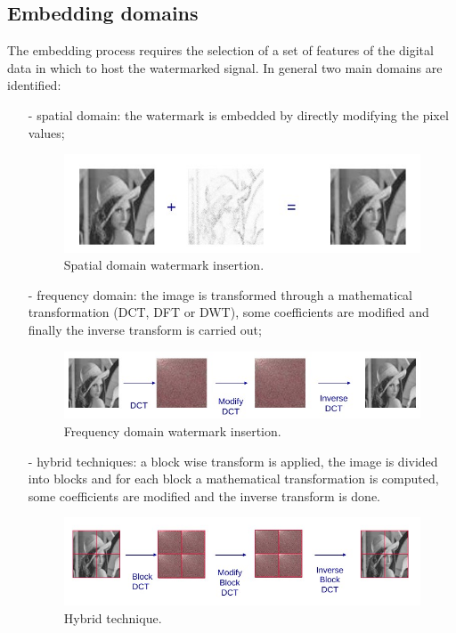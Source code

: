 \subsection{Embedding domains}
The embedding process requires the selection of a set of features of the digital data in which to host the watermarked signal. In general two main domains are identified:
\begin{itemize}
\item[-] spatial domain: the watermark is embedded by directly modifying the pixel values;
\begin{figure}[h!]
\centering
\includegraphics[width=1\textwidth]{./img/domain1.jpg}
\caption{\small{Spatial domain watermark insertion.}}
\label{fig:dom1}
\end{figure}
\item[-] frequency domain: the image is transformed through a mathematical transformation (DCT, DFT or DWT), some coefficients are modified and finally the inverse transform is carried out;
\begin{figure}[h!]
\centering
\includegraphics[width=1\textwidth]{./img/domain2.jpg}
\caption{\small{Frequency domain watermark insertion.}}
\label{fig:dom2}
\end{figure}
\item[-] hybrid techniques: a block wise transform is applied, the image is divided
into blocks and for each block a mathematical transformation is computed, some coefficients are modified and the inverse transform is done.
\begin{figure}[h!]
\centering
\includegraphics[width=1\textwidth]{./img/domain3.jpg}
\caption{\small{Hybrid technique.}}
\label{fig:dom3}
\end{figure}
\end{itemize}

